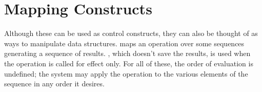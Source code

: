 \section{Mapping Constructs} \label{sec:controlmap}

Although these can be used as control constructs, they can also be
thought of as ways to manipulate data structures.   maps an
operation over some sequences generating a sequence of results.
, which doesn't save the results, is used when the
operation is called for effect only.  For all of these, the order of
evaluation is undefined; the system may apply the operation to the
various elements of the sequence in any order it desires.

